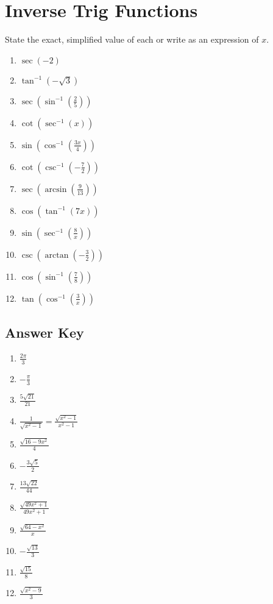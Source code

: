 \chapter{Inverse Trig Functions}

State the exact, simplified value of each or write as an expression of $x$.

\begin{multicols}{2}
\begin{enumerate}
	\item $\sec\left(-2\right)$
	\item $\tan^{-1}\left(-\sqrt{3}\right)$
	\item $\sec\left(\sin^{-1}\left(\frac{2}{5}\right)\right)$
	\item $\cot\left(\sec^{-1}(x)\right)$
	\item $\sin\left(\cos^{-1}\left(\frac{3x}{4}\right)\right)$
	\item $\cot\left(\csc^{-1}\left(-\frac{7}{2}\right)\right)$
	\item $\sec\left(\arcsin\left(\frac{9}{13}\right)\right)$
	\item $\cos\left(\tan^{-1}(7x)\right)$
	\item $\sin\left(\sec^{-1}\left(\frac{8}{x}\right)\right)$
	\item $\csc\left(\arctan\left(-\frac{3}{2}\right)\right)$
	\item $\cos\left(\sin^{-1}\left(\frac{7}{8}\right)\right)$
	\item $\tan\left(\cos^{-1}\left(\frac{3}{x}\right)\right)$
\end{enumerate}
\end{multicols}

\newpage

\section{Answer Key}

\begin{enumerate}
	\item $\frac{2\pi}{3}$
	\item $-\frac{\pi}{3}$
    \item $\frac{5\sqrt{21}}{21}$
    \item $\frac{1}{\sqrt{x^2-1}} = \frac{\sqrt{x^2-1}}{x^2-1}$
    \item $\frac{\sqrt{16-9x^2}}{4}$
    \item $-\frac{3\sqrt{5}}{2}$
    \item $\frac{13\sqrt{22}}{44}$
    \item $\frac{\sqrt{49x^2+1}}{49x^2+1}$
    \item $\frac{\sqrt{64-x^2}}{x}$
    \item $-\frac{\sqrt{13}}{3}$
    \item $\frac{\sqrt{15}}{8}$
    \item $\frac{\sqrt{x^2-9}}{3}$
\end{enumerate}

